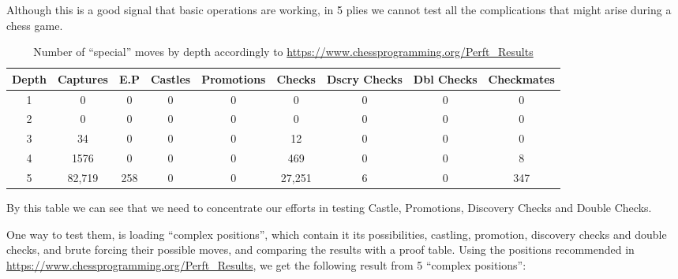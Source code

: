 \documentclass[10pt]{article}
\begin{document}
Although this is a good signal that basic operations are working, in 5 plies we
cannot test all the complications that might arise during a chess game.

\begin{table}[h]
\center
\begin{tabular}{|c|c|c|c|c|c|c|c|c|}
\hline
\textbf{Depth}   & \textbf{Captures} & \textbf{E.P} &
\textbf{Castles} & \textbf{Promotions} & \textbf{Checks} & \textbf{Dscry
Checks} & \textbf{Dbl Checks} & \textbf{Checkmates} \\
\hline
   1  & 0 & 0 & 0 & 0 & 0 & 0 & 0 & 0 \\
\hline
   2  & 0 & 0 & 0 & 0 & 0 & 0 & 0 & 0 \\
\hline
   3  & 34 & 0 & 0 & 0 & 12 & 0 & 0 & 0 \\
\hline
   4  & 1576 & 0 & 0 & 0 & 469 & 0 & 0 & 8 \\
\hline
5  & 82,719 & 258 & 0 & 0 & 27,251 & 6 & 0 & 347 \\
\hline
\end{tabular}
\caption{Number of ``special'' moves by depth accordingly to
\url{https://www.chessprogramming.org/Perft_Results} }
\end{table}

By this table we can see that we need to concentrate our efforts in testing
Castle, Promotions, Discovery Checks and Double Checks.

One way to test them, is loading ``complex positions'', which contain it its
possibilities, castling, promotion, discovery checks and double checks, and brute forcing their
possible moves, and comparing the results with a proof table. Using the
positions recommended in \url{https://www.chessprogramming.org/Perft_Results},
we get the following result from 5 ``complex positions'':
\end{document}
